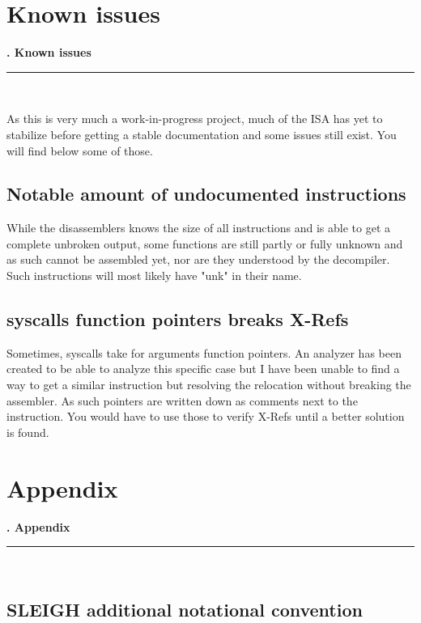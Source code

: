\documentclass[openany,oneside]{memoir}
\newcommand{\Line}{\rule{\linewidth}{1.0mm}}
\newcommand{\Chapter}[1]{
\pagestyle{fancy}
\chapter{#1}
\begin{vplace}[0.7]
{\Huge   \null\hfill{\textbf{\thechapter.  #1}}} \\
\Line \\
\end{vplace} 
\newpage
}
\begin{document}
\Chapter{Known issues}
As this is very much a work-in-progress project, much of the ISA has yet to
stabilize before getting a stable documentation and some issues still exist. You
will find below some of those.

\section{Notable amount of undocumented instructions}
While the disassemblers knows the size of all instructions and is able to get a
complete unbroken output, some functions are still partly or fully unknown and
as such cannot be assembled yet, nor are they understood by the decompiler. Such
instructions will most likely have "unk" in their name.

\section{syscalls function pointers breaks X-Refs}
Sometimes, syscalls take for arguments function pointers. An analyzer has been
created to be able to analyze this specific case but I have been unable to find
a way to get a similar instruction but resolving the relocation without breaking
the assembler.
As such pointers are written down as comments next to the instruction. You would
have to use those to verify X-Refs until a better solution is found.


\Chapter{Appendix}
\section{SLEIGH additional notational convention}
 
\end{document}
